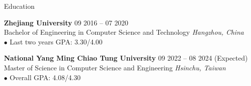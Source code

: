 \documentclass{resume}
\begin{document}

\begin{rSection}{Education}

{\bf Zhejiang University} \hfill {09 2016 -- 07 2020}\\
{Bachelor of Engineering in Computer Science and Technology} \hfill \textit{Hangzhou, China}\\
$\bullet$ Last two years GPA: 3.30/4.00

{\bf National Yang Ming Chiao Tung University} \hfill {09 2022 -- 08 2024 (Expected)}\\
{Master of Science in Computer Science and Engineering} \hfill \textit{Hsinchu, Taiwan}\\
$\bullet$ Overall GPA: 4.08/4.30

\end{rSection}

\end{document}
